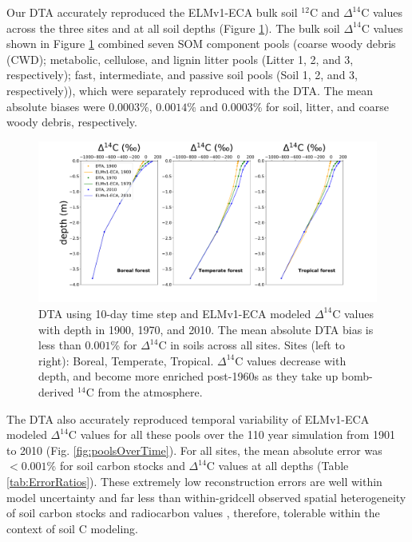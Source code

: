 \documentclass[draft]{agujournal2019}
\begin{document}
Our DTA accurately reproduced the ELMv1-ECA bulk soil  $^{12}$C and $\Delta^{14}$C values across the three sites and at all soil depths (Figure \ref{fig:depthProfiles}). The bulk soil $\Delta^{14}$C values shown in Figure \ref{fig:depthProfiles} combined seven SOM component pools (coarse woody debris (CWD); metabolic, cellulose, and lignin litter pools (Litter 1, 2, and 3, respectively); fast, intermediate, and passive soil pools (Soil 1, 2, and 3, respectively)), which were separately reproduced with the DTA. The mean absolute biases were $0.0003$\%, $0.0014$\% and $0.0003$\% for soil, litter, and coarse woody debris, respectively.

\begin{figure}[htbp]
        \centering 
        \includegraphics[width=1.1\linewidth]{figs/depth_profile_10.pdf}
        \caption{DTA using 10-day time step and ELMv1-ECA modeled $\Delta^{14}$C values with depth in 1900, 1970, and 2010. The mean absolute DTA bias is less than $0.001$\% for $\Delta^{14}$C in soils across all sites. Sites (left to right): Boreal, Temperate, Tropical. $\Delta^{14}$C values decrease with depth, and become more enriched post-1960s as they take up bomb-derived $^{14}$C from the atmosphere.
        \label{fig:depthProfiles}
        }
\end{figure}      


The DTA also accurately reproduced temporal variability of ELMv1-ECA modeled $\Delta^{14}$C values for all these pools over the 110 year simulation from 1901 to 2010 (Fig. \ref{fig:poolsOverTime}). For all sites, the mean absolute error was $<0.001$\% for soil carbon stocks and $\Delta^{14}$C values at all depths (Table \ref{tab:ErrorRatios}). These extremely low reconstruction errors are well within model uncertainty and far less than within-gridcell observed spatial heterogeneity of soil carbon stocks and radiocarbon values \cite{Chen2009JGR, Lawrence2019}, therefore, tolerable within the context of soil C modeling.
\end{document}

